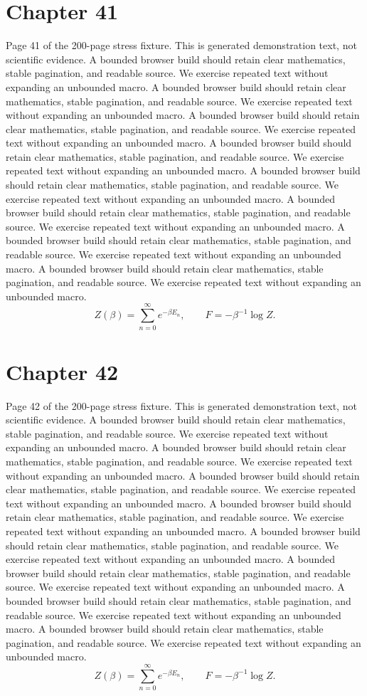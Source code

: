 \documentclass[11pt]{article}
\begin{document}
\section*{Chapter 41}
Page 41 of the 200-page stress fixture. This is generated demonstration text, not scientific evidence.
A bounded browser build should retain clear mathematics, stable pagination, and readable source. We exercise repeated text without expanding an unbounded macro.
A bounded browser build should retain clear mathematics, stable pagination, and readable source. We exercise repeated text without expanding an unbounded macro.
A bounded browser build should retain clear mathematics, stable pagination, and readable source. We exercise repeated text without expanding an unbounded macro.
A bounded browser build should retain clear mathematics, stable pagination, and readable source. We exercise repeated text without expanding an unbounded macro.
A bounded browser build should retain clear mathematics, stable pagination, and readable source. We exercise repeated text without expanding an unbounded macro.
A bounded browser build should retain clear mathematics, stable pagination, and readable source. We exercise repeated text without expanding an unbounded macro.
A bounded browser build should retain clear mathematics, stable pagination, and readable source. We exercise repeated text without expanding an unbounded macro.
A bounded browser build should retain clear mathematics, stable pagination, and readable source. We exercise repeated text without expanding an unbounded macro.
\[Z(\beta)=\sum_{n=0}^{\infty}e^{-\beta E_n},\qquad F=-\beta^{-1}\log Z.\]
\newpage
\section*{Chapter 42}
Page 42 of the 200-page stress fixture. This is generated demonstration text, not scientific evidence.
A bounded browser build should retain clear mathematics, stable pagination, and readable source. We exercise repeated text without expanding an unbounded macro.
A bounded browser build should retain clear mathematics, stable pagination, and readable source. We exercise repeated text without expanding an unbounded macro.
A bounded browser build should retain clear mathematics, stable pagination, and readable source. We exercise repeated text without expanding an unbounded macro.
A bounded browser build should retain clear mathematics, stable pagination, and readable source. We exercise repeated text without expanding an unbounded macro.
A bounded browser build should retain clear mathematics, stable pagination, and readable source. We exercise repeated text without expanding an unbounded macro.
A bounded browser build should retain clear mathematics, stable pagination, and readable source. We exercise repeated text without expanding an unbounded macro.
A bounded browser build should retain clear mathematics, stable pagination, and readable source. We exercise repeated text without expanding an unbounded macro.
A bounded browser build should retain clear mathematics, stable pagination, and readable source. We exercise repeated text without expanding an unbounded macro.
\[Z(\beta)=\sum_{n=0}^{\infty}e^{-\beta E_n},\qquad F=-\beta^{-1}\log Z.\]
\newpage
\end{document}
